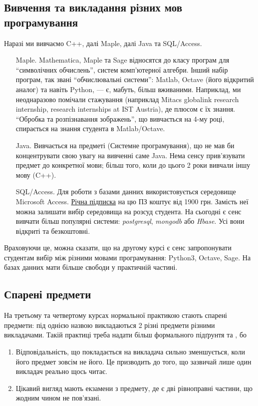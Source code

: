 \documentclass[14pt, a4paper]{extarticle}  %
\begin{document}
\subsection{Вивчення та викладання різних мов програмування}
\label{Languages}

Наразі ми вивчаємо C++, далі Maple, далі Java та SQL/Access. 
\begin{itemize}
    \item [Maple.] Mathematica, Maple та Sage відносятся до класу програм для ``символічних обчислень'', систем комп'ютерної алгебри. Інший набір програм, так звані ``обчислювальні системи'': Matlab, Octave (його відкритий аналог) та навіть Python, --- є, мабуть, більш вживаними. Наприклад, ми неоднаразово помічали стажування (наприклад Mitacs globalink research internship, research internships at IST Austria), де плюсом є їх знання. ``Обробка та розпізнавання зображень'', що вивчається на 4-му році, спирається на знання студента в Matlab/Octave. 
    
    \item [Java.] Вивчається на предметі (Системне програмування), що не мав би концентрувати свою увагу на вивченні саме Java. Нема сенсу прив'я\-зувати предмет до конкретної мови; більш того, коли до цього 2 роки вивчали іншу мову (C++).  
    
    \item [SQL/Access.] Для роботи з базами данних використовується середовище Microsoft Access. \href{https://products.office.com/uk-UA/buy/office}{Річна підписка} на цю ПЗ коштує від 1900 грн. Замість неї можна залишати вибір середовища на розсуд студента. На сьогодні є сенс вивчати більш популярні системи: \textit{postgresql}, \textit{mongodb} або \textit{Hbase}. Усі вони відкриті та безкоштовні. 
\end{itemize}



Враховуючи це, можна сказати, що на другому курсі є сенс запропонувати студентам вибір між різними мовами програмування: Python3, Octave, Sage. 
На базах данних мати більше свободи у практичній частині. 

\subsection{Спарені предмети}
\label{conjunctions}
На третьому та четвертому курсах нормальної практикою стають спарені предмети: під однією назвою викладаються 2 різні предмети різними викладачами. Такій практиці треба надати більш формального підґрунтя та , бо 
\begin{enumerate}
    \item Відповідальність, що покладається на викладача сильно зменшується, коли його предмет зовсім не його. Це призводить до того, що зазвичай лише один викладач реально щось читає.
    \item Цікавий вигляд мають екзамени з предмету, де є дві рівноправні частини, що жодним чином не пов'язані. 
\end{enumerate}
\end{document}
